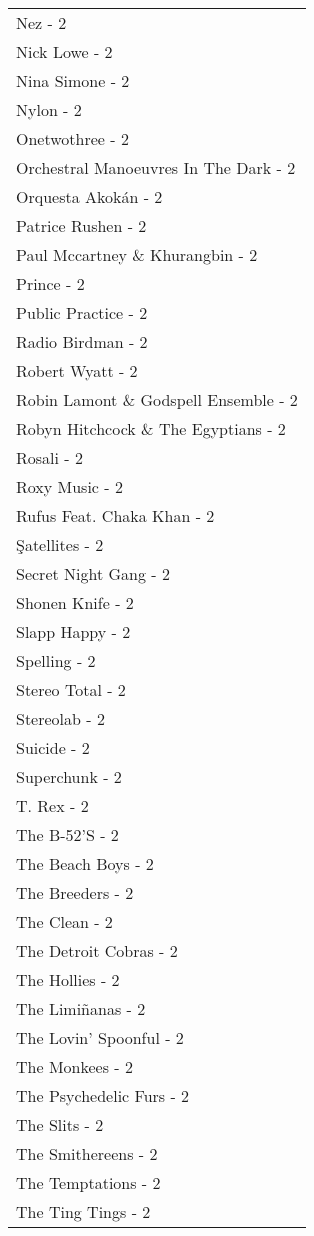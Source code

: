 \documentclass[
]{article}
\begin{document}
\begin{longtable}{l}
Nez - 2 \\ 
Nick Lowe - 2 \\ 
Nina Simone - 2 \\ 
Nylon - 2 \\ 
Onetwothree - 2 \\ 
Orchestral Manoeuvres In The Dark - 2 \\ 
Orquesta Akokán - 2 \\ 
Patrice Rushen - 2 \\ 
Paul Mccartney \& Khurangbin - 2 \\ 
Prince - 2 \\ 
Public Practice - 2 \\ 
Radio Birdman - 2 \\ 
Robert Wyatt - 2 \\ 
Robin Lamont \& Godspell Ensemble - 2 \\ 
Robyn Hitchcock \& The Egyptians - 2 \\ 
Rosali - 2 \\ 
Roxy Music - 2 \\ 
Rufus Feat. Chaka Khan - 2 \\ 
Şatellites - 2 \\ 
Secret Night Gang - 2 \\ 
Shonen Knife - 2 \\ 
Slapp Happy - 2 \\ 
Spelling - 2 \\ 
Stereo Total - 2 \\ 
Stereolab - 2 \\ 
Suicide - 2 \\ 
Superchunk - 2 \\ 
T. Rex - 2 \\ 
The B-52'S - 2 \\ 
The Beach Boys - 2 \\ 
The Breeders - 2 \\ 
The Clean - 2 \\ 
The Detroit Cobras - 2 \\ 
The Hollies - 2 \\ 
The Limiñanas - 2 \\ 
The Lovin' Spoonful - 2 \\ 
The Monkees - 2 \\ 
The Psychedelic Furs - 2 \\ 
The Slits - 2 \\ 
The Smithereens - 2 \\ 
The Temptations - 2 \\ 
The Ting Tings - 2 \\ 

\end{longtable}
\end{document}

